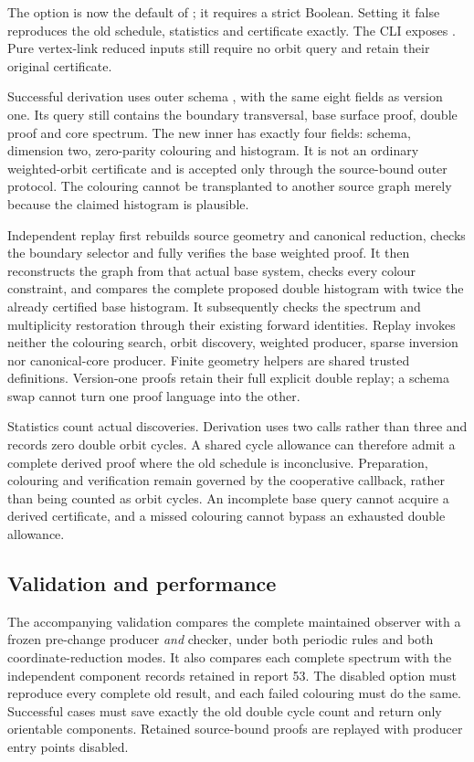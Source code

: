 The option  is now the default of
; it requires a strict Boolean. Setting it
false reproduces the old schedule, statistics and certificate exactly.
The CLI exposes . Pure vertex-link reduced inputs
still require no orbit query and retain their original certificate.

Successful derivation uses outer schema ,
with the same eight fields as version one. Its query still contains the
boundary transversal, base surface proof, double proof and core spectrum.
The new inner  has exactly
four fields: schema, dimension two, zero-parity colouring and histogram.
It is not an ordinary weighted-orbit certificate and is accepted only through
the source-bound outer protocol. The colouring cannot be transplanted to
another source graph merely because the claimed histogram is plausible.

Independent replay first rebuilds source geometry and canonical reduction,
checks the boundary selector and fully verifies the base weighted proof.
It then reconstructs the graph from that actual base system, checks every
colour constraint, and compares the complete proposed double histogram
with twice the already certified base histogram. It subsequently checks the
spectrum and multiplicity restoration through their existing forward
identities. Replay invokes neither the colouring search, orbit discovery,
weighted producer, sparse inversion nor canonical-core producer. Finite
geometry helpers are shared trusted definitions. Version-one proofs retain
their full explicit double replay; a schema swap cannot turn one proof
language into the other.

Statistics count actual discoveries. Derivation uses two calls rather than
three and records zero double orbit cycles. A shared cycle allowance can
therefore admit a complete derived proof where the old schedule is
inconclusive. Preparation, colouring and verification remain governed by
the cooperative callback, rather than being counted as orbit cycles.
An incomplete base query cannot acquire a derived certificate, and a missed
colouring cannot bypass an exhausted double allowance.

\subsection{Validation and performance}

The accompanying validation compares the complete maintained observer with
a frozen pre-change producer \emph{and} checker, under both periodic rules
and both coordinate-reduction modes. It also compares each complete spectrum
with the independent component records retained in report 53. The disabled
option must reproduce every complete old result, and each failed colouring
must do the same. Successful cases must save exactly the old double cycle
count and return only orientable components. Retained source-bound proofs
are replayed with producer entry points disabled.

